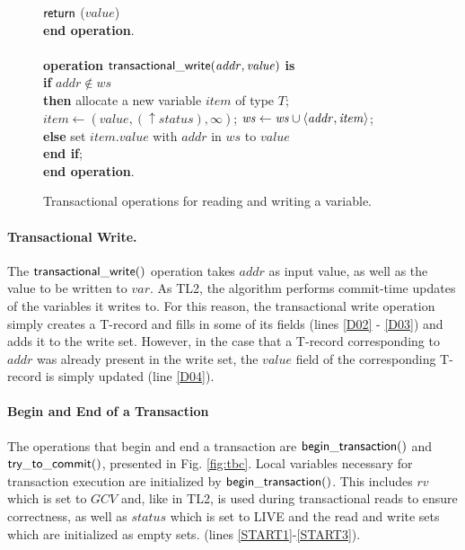\begin{figure} [htb]
{{\begin{minipage}[t]{1\linewidth}
\begin{tabbing}
 \> ${\sf return}$ ($\mathit{value}$) \\
{\bf end operation}. \\
\\
{\bf operation}  ${\sf transactional\_write}(\mathit{addr, value})$ {\bf is}\\
 \> {\bf if} $\mathit{addr} \not\in \mathit{ws}$  \\
 \>\> {\bf then} \> allocate a new variable $item$ of type $T$; \\
 \>\>\> $\mathit{item}  \gets (\mathit{value, (\uparrow status), \infty})$; 
                   $\mathit{ws} \gets \mathit{ws} \cup \left \langle \mathit{addr, item} \right \rangle $; \\
 \>\> {\bf else} \> set $\mathit{item.value}$ with $\mathit{addr}$ in $\mathit{ws}$ to $\mathit{value}$ \\
 \> {\bf end if}; \\
{\bf end operation}.
\end{tabbing}
\normalsize
\end{minipage}
}
\caption{Transactional operations for reading and writing a variable.}
\label{fig:tops}
}
\end{figure}

\paragraph{Transactional Write.}
The ${\sf transactional\_write()}$ operation
takes $\mathit{addr}$ as input value, as well as the value 
to be written to $\mathit{var}$. As  TL2, the algorithm 
performs commit-time updates of the variables it writes to. 
For this reason, the transactional write  
operation simply creates a T-record and fills in some of its 
fields (lines \ref{D02} - \ref{D03}) and 
adds it to the write set.
However, in the case that a T-record corresponding to $\mathit{addr}$  was
already present in  the write set, the
$\mathit{value}$ field of the corresponding  
T-record is simply updated (line \ref{D04}).


\paragraph{Begin and End of a Transaction} 
The operations that begin and end a transaction are ${\sf begin\_transaction()}$ 
and ${\sf try\_to\_commit()}$, presented in Fig. \ref{fig:tbc}. 
Local variables necessary for transaction execution are initialized by  ${\sf begin\_transaction()}$.
This includes $\mathit{rv}$
which is set to $\mathit{GCV}$ and, like in TL2, is used during transactional
reads to ensure correctness, 
as well as $\mathit{status}$ which is set to LIVE and the read and write sets
which are initialized as empty sets.
(lines \ref{START1}-\ref{START3}). 

